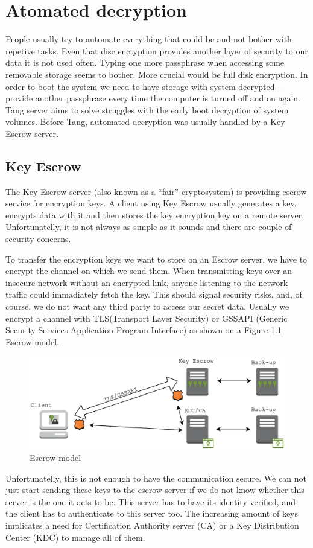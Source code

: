 \chapter{Atomated decryption}

People usually try to automate everything that could be and not bother with repetive tasks.
Even that disc enctyption provides another layer of security to our data it is not used often.
Typing one more passphrase when accessing some removable storage seems to bother.
More crucial would be full disk encryption.
In order to boot the system we need to have storage with system decrypted - provide another passphrase every time the computer is turned off and on again.
Tang server aims to solve struggles with the early boot decryption of system volumes.
Before Tang, automated decryption was usually handled by a Key Escrow server.

\section{Key Escrow}\label{escrow}

The Key Escrow server (also known as a “fair” cryptosystem) is providing escrow service for encryption keys.
A client using Key Escrow usually generates a key, encrypts data with it and then stores the key encryption key on a remote server.
Unfortunatelly, it is not always as simple as it sounds and there are couple of security concerns.

To transfer the encryption keys we want to store on an Escrow server, we have to encrypt the channel on which we send them.
When transmitting keys over an insecure network without an encrypted link, anyone listening to the network traffic could immadiately fetch the key.
This should signal security risks, and, of course, we do not want any third party to access our secret data.
Usually we encrypt a channel with TLS(Transport Layer Security) or GSSAPI (Generic Security Services Application Program Interface) as shown on a Figure \ref{fig_escrowmodel} Escrow model.
\begin{figure}[h]
    \centering
    \includegraphics[scale=0.7]{figures/EscrowModel.pdf}
    \caption{Escrow model}
    \label{fig_escrowmodel}
\end{figure}
Unfortunatelly, this is not enough to have the communication secure.
We can not just start sending these keys to the escrow server if we do not know whether this server is the one it acts to be.
This server has to have its identity verified, and the client has to authenticate to this server too.
The increasing amount of keys implicates a need for Certification Authority server (CA) or a Key Distribution Center (KDC) to manage all of them.

